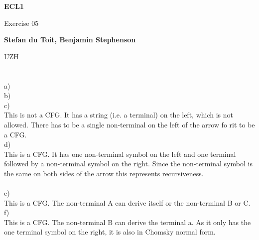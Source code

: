 \documentclass{article}
\newcommand{\studentName}{Stefan du Toit, Benjamin Stephenson}
\newcommand{\courseTitle}{ECL1}
\newcommand{\assignmentTitle}{Exercise 05}
\begin{document}
\begin{titlepage}
    \begin{center}
        \vspace*{1cm}
        
        \Huge \textbf{\courseTitle}
        
        \LARGE \assignmentTitle
        
        \vspace{0.5cm}
     
        
        \vspace{1.5cm}
        
        \Large \textbf{\studentName}
        
        \vfill
        
  
        
        \vspace{0.8cm}
        
     
        
        \vspace{1cm}
        
        \Large UZH
        
    \end{center}
\end{titlepage}

\section{}		%
\subsection{}
a) \\
b) \\
c) \\
This is not a CFG. It has a string (i.e. a terminal) on the left, which is not allowed. There has to be a single non-terminal on the left of the arrow fo rit to be a CFG.  \\
d) \\
This is a CFG. It has one non-terminal symbol on the left and one terminal followed by a non-terminal symbol on the right. Since the non-terminal symbol is the same on both sides of the arrow this represents recursiveness. \\ \\
e) \\
This is a CFG. The non-terminal A can derive itself or the non-terminal B or C. \\
f) \\
This is a CFG. The non-terminal B can derive the terminal a. As it only has the one terminal symbol on the right, it is also in Chomsky normal form.\\
\end{document}
